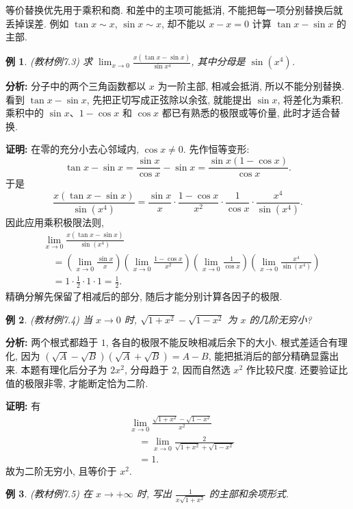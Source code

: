 \documentclass[UTF8,openany]{ctexbook}
\theoremstyle{chinesetextbook}
\newtheorem{example}{例}[section]
\newenvironment{cnproof}{\par\indent\textbf{证明:} \ignorespaces}{\par}
\begin{document}
等价替换优先用于乘积和商. 和差中的主项可能抵消, 不能把每一项分别替换后就丢掉误差. 例如 $\tan x\sim x$, $\sin x\sim x$, 却不能以 $x-x=0$ 计算 $\tan x-\sin x$ 的主部.
\begin{example}
(教材例7.3) 求 $\displaystyle \lim_{x\to0}\frac{x(\tan x-\sin x)}{\sin x^4}$, 其中分母是 $\sin(x^4)$.
\end{example}
\par\indent\textbf{分析:} 分子中的两个三角函数都以 $x$ 为一阶主部, 相减会抵消, 所以不能分别替换. 看到 $\tan x-\sin x$, 先把正切写成正弦除以余弦, 就能提出 $\sin x$, 将差化为乘积. 乘积中的 $\sin x$、$1-\cos x$ 和 $\cos x$ 都已有熟悉的极限或等价量, 此时才适合替换.
\begin{cnproof}
在零的充分小去心邻域内, $\cos x\ne0$. 先作恒等变形:
\[
\tan x-\sin x=\frac{\sin x}{\cos x}-\sin x
=\frac{\sin x(1-\cos x)}{\cos x}.
\]
于是
\[
\frac{x(\tan x-\sin x)}{\sin(x^4)}
=\frac{\sin x}{x}\cdot\frac{1-\cos x}{x^2}
 \cdot\frac1{\cos x}\cdot\frac{x^4}{\sin(x^4)}.
\]
因此应用乘积极限法则,
\[
\begin{aligned}
&\lim_{x\to0}\frac{x(\tan x-\sin x)}{\sin(x^4)}\\
&\quad=\left(\lim_{x\to0}\frac{\sin x}x\right)
\left(\lim_{x\to0}\frac{1-\cos x}{x^2}\right)
\left(\lim_{x\to0}\frac1{\cos x}\right)
\left(\lim_{x\to0}\frac{x^4}{\sin(x^4)}\right)\\
&\quad=1\cdot\frac12\cdot1\cdot1=\frac12.
\end{aligned}
\]
精确分解先保留了相减后的部分, 随后才能分别计算各因子的极限.
\end{cnproof}
\begin{example}
(教材例7.4) 当 $x\to0$ 时, $\sqrt{1+x^2}-\sqrt{1-x^2}$ 为 $x$ 的几阶无穷小?
\end{example}
\par\indent\textbf{分析:} 两个根式都趋于 $1$, 各自的极限不能反映相减后余下的大小. 根式差适合有理化, 因为 $(\sqrt A-\sqrt B)(\sqrt A+\sqrt B)=A-B$, 能把抵消后的部分精确显露出来. 本题有理化后分子为 $2x^2$, 分母趋于 $2$, 因而自然选 $x^2$ 作比较尺度. 还要验证比值的极限非零, 才能断定恰为二阶.
\begin{cnproof}
有
\[
\begin{aligned}
&\lim_{x\to0}\frac{\sqrt{1+x^2}-\sqrt{1-x^2}}{x^2}\\
&\quad=\lim_{x\to0}\frac2{\sqrt{1+x^2}+\sqrt{1-x^2}}\\
&\quad=1.
\end{aligned}
\]
故为二阶无穷小, 且等价于 $x^2$.
\end{cnproof}
\begin{example}
(教材例7.5) 在 $x\to+\infty$ 时, 写出 $\displaystyle \frac1{x\sqrt{1+x^2}}$ 的主部和余项形式.
\end{example}
\end{document}
